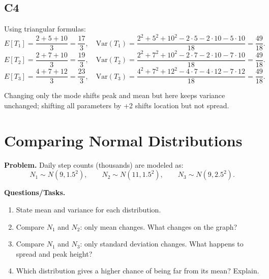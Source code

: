 \subsection*{C4}
Using triangular formulas:
\[
E[T_1]=\frac{2+5+10}{3}=\frac{17}{3},\quad
\mathrm{Var}(T_1)=\frac{2^2+5^2+10^2-2\cdot5-2\cdot10-5\cdot10}{18}=\frac{49}{18}.
\]
\[
E[T_2]=\frac{2+7+10}{3}=\frac{19}{3},\quad
\mathrm{Var}(T_2)=\frac{2^2+7^2+10^2-2\cdot7-2\cdot10-7\cdot10}{18}=\frac{49}{18}.
\]
\[
E[T_3]=\frac{4+7+12}{3}=\frac{23}{3},\quad
\mathrm{Var}(T_3)=\frac{4^2+7^2+12^2-4\cdot7-4\cdot12-7\cdot12}{18}=\frac{49}{18}.
\]
\begin{center}
\end{center}
Changing only the mode shifts peak and mean but here keeps variance unchanged; shifting all parameters by +2 shifts location but not spread.

\section{Comparing Normal Distributions}

\textbf{Problem.}
Daily step counts (thousands) are modeled as:
\[
N_1\sim N(9,1.5^2),\qquad N_2\sim N(11,1.5^2),\qquad N_3\sim N(9,2.5^2).
\]

\textbf{Questions/Tasks.}
\begin{enumerate}[label=\textbf{\alph*)}]
  \item State mean and variance for each distribution.
  \item Compare \(N_1\) and \(N_2\): only mean changes. What changes on the graph?
  \item Compare \(N_1\) and \(N_3\): only standard deviation changes. What happens to spread and peak height?
  \item Which distribution gives a higher chance of being far from its mean? Explain.
\end{enumerate}

